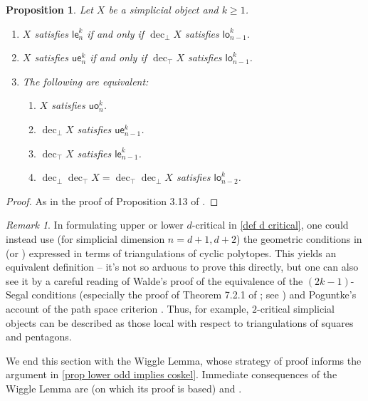 \documentclass{amsart}
\newcommand{\lowev}{\mathsf{le}}
\newcommand{\lowod}{\mathsf{lo}}
\newcommand{\uppev}{\mathsf{ue}}
\newcommand{\uppod}{\mathsf{uo}}
\newcommand{\decbot}{\operatorname{dec}_\bot}
\newcommand{\dectop}{\operatorname{dec}_\top}
\newtheorem{proposition}[theorem]{Proposition}
\theoremstyle{definition}
\theoremstyle{remark}
\newtheorem{remark}[theorem]{Remark}
\begin{document}
\begin{proposition}\label{easy psc}
Let $X$ be a simplicial object and $k\geq 1$.
\begin{enumerate}
		\item $X$ satisfies $\lowev^k_n$ if and only if $\decbot X$ satisfies $\lowod^k_{n-1}$.\label{PSC ldec}
		\item $X$ satisfies $\uppev^k_n$ if and only if $\dectop X$ satisfies $\lowod^k_{n-1}$.\label{PSC udec}
		\item The following are equivalent:
		\begin{enumerate}[label={\alph*.}, ref=\alph*]
		\item $X$ satisfies $\uppod^k_n$.
		\item $\decbot X$ satisfies $\uppev^k_{n-1}$.
		\item $\dectop X$ satisfies $\lowev^k_{n-1}$.
		\item $\decbot \dectop X = \dectop \decbot X$ satisfies $\lowod^k_{n-2}$.
		\end{enumerate}
\end{enumerate}
\end{proposition}
\begin{proof}
As in the proof of Proposition 3.13 of \cite{HackneyLynd:HSSPG}.
\end{proof}



\begin{remark}\label{rmk d crit}
In formulating upper or lower $d$-critical in \cref{def d critical}, one could instead use (for simplicial dimension $n=d+1,d+2$) the geometric conditions in \cite[Definition 3.7]{Dyckerhoff:CPOC} (or \cite[Definition 2.2]{Poguntke:HSSAKT}) expressed in terms of triangulations of cyclic polytopes.
This yields an equivalent definition -- it's not so arduous to prove this directly, but one can also see it by a careful reading of Walde's proof of the equivalence of the $(2k{-}1)$-Segal conditions (especially the proof of Theorem 7.2.1 of \cite{Walde:HSSHE}; see \cite[Remark 3.6]{HackneyLynd:HSSPG}) and Poguntke's account of the path space criterion \cite[Proposition 2.7]{Poguntke:HSSAKT}.
Thus, for example, $2$-critical simplicial objects can be described as those local with respect to triangulations of squares and pentagons.
\end{remark}

We end this section with the Wiggle Lemma, whose strategy of proof informs the argument in \cref{prop lower odd implies coskel}.
Immediate consequences of the Wiggle Lemma are \cite[Lemma 3.9]{HackneyLynd:HSSPG} (on which its proof is based) and \cite[Lemma 3.6]{GKT1}.
\end{document}
